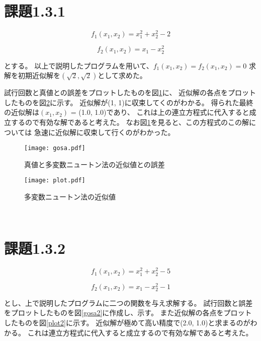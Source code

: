 \documentclass[uplatex, 11pt,a4j, titlepage]{jsarticle}
\begin{document}
\section{課題1.3.1}

\begin{equation}
    f_1(x_1, x_2) = x_1^2 + x_2^2 - 2
\end{equation}

\begin{equation}
    f_2(x_1, x_2) = x_1 - x_2^2
\end{equation}

とする。
以上で説明したプログラムを用いて、$f_1(x_1, x_2) = f_2(x_1, x_2) = 0$
求解を初期近似解を$(\sqrt{2},\sqrt{2})$として求めた。

試行回数と真値との誤差をプロットしたものを図\ref{gosa}に、
近似解の各点をプロットしたものを図\ref{plot}に示す。
近似解が(1, 1)に収束してくのがわかる。
得られた最終の近似解は$(x_1, x_2)$ = (1.0, 1.0)であり、
これは上の連立方程式に代入すると成立するので有効な解であると考えた。
なお図\ref{gosa}を見ると、この方程式のこの解については
急速に近似解に収束して行くのがわかった。

\begin{figure}[h]
    \centering
    \texttt{[image: gosa.pdf]}
    \caption{真値と多変数ニュートン法の近似値との誤差}
    \label{gosa}
\end{figure}

\begin{figure}[h]
    \centering
    \texttt{[image: plot.pdf]}
    \caption{多変数ニュートン法の近似値}
    \label{plot}
\end{figure}

\newpage
\newpage
\ 
\newpage

\section{課題1.3.2}

\begin{equation}
    f_1(x_1, x_2) = x_1^2 + x_2^2 - 5
\end{equation}

\begin{equation}
    f_2(x_1, x_2) = x_1 - x_2 ^2 -1
\end{equation}

とし、上で説明したプログラムに二つの関数を与え求解する。
試行回数と誤差をプロットしたものを図\ref{gosa2}に作成し、示す。
また近似解の各点をプロットしたものを図\ref{plot2}に示す。
近似解が極めて高い精度で(2.0, 1.0)と求まるのがわかる。
これは連立方程式に代入すると成立するので有効な解であると考えた。
\end{document}
